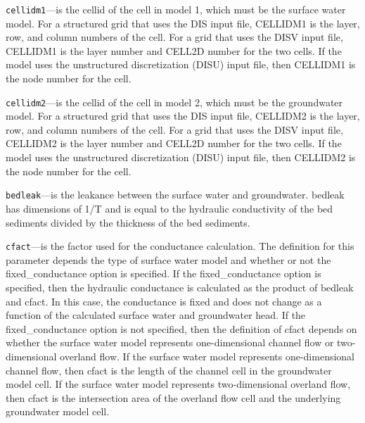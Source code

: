 \begin{description}
\item \texttt{cellidm1}---is the cellid of the cell in model 1, which must be the surface water model. For a structured grid that uses the DIS input file, CELLIDM1 is the layer, row, and column numbers of the cell.   For a grid that uses the DISV input file, CELLIDM1 is the layer number and CELL2D number for the two cells.  If the model uses the unstructured discretization (DISU) input file, then CELLIDM1 is the node number for the cell.

\item \texttt{cellidm2}---is the cellid of the cell in model 2, which must be the groundwater model. For a structured grid that uses the DIS input file, CELLIDM2 is the layer, row, and column numbers of the cell.   For a grid that uses the DISV input file, CELLIDM2 is the layer number and CELL2D number for the two cells.  If the model uses the unstructured discretization (DISU) input file, then CELLIDM2 is the node number for the cell.

\item \texttt{bedleak}---is the leakance between the surface water and groundwater.  bedleak has dimensions of 1/T and is equal to the hydraulic conductivity of the bed sediments divided by the thickness of the bed sediments.

\item \texttt{cfact}---is the factor used for the conductance calculation.  The definition for this parameter depends the type of surface water model and whether or not the fixed\_conductance option is specified.  If the fixed\_conductance option is specified, then the hydraulic conductance is calculated as the product of bedleak and cfact.  In this case, the conductance is fixed and does not change as a function of the calculated surface water and groundwater head.  If the fixed\_conductance option is not specified, then the definition of cfact depends on whether the surface water model represents one-dimensional channel flow or two-dimensional overland flow.  If the surface water model represents one-dimensional channel flow, then cfact is the length of the channel cell in the groundwater model cell.  If the surface water model represents two-dimensional overland flow, then cfact is the intersection area of the overland flow cell and the underlying groundwater model cell.

\end{description}

